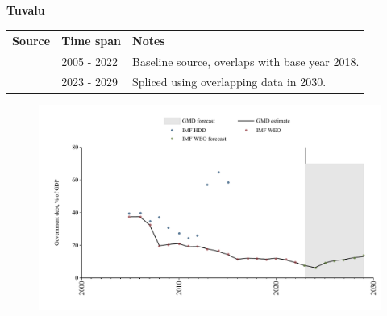 \documentclass[12pt,a4paper,landscape]{article}
\begin{document}
\begin{adjustbox}{max totalsize={\paperwidth}{\paperheight},center}
\begin{minipage}[t][\textheight][t]{\textwidth}
\vspace*{0.5cm}
{}
\begin{center}
{\Large\bfseries Tuvalu}
\end{center}
\vspace{0.5cm}
\begin{table}[H]
\centering
\small
\begin{tabular}{|l|l|l|}
\hline
\textbf{Source} & \textbf{Time span} & \textbf{Notes} \\
\hline
\rowcolor{white}\cite{IMF_WEO}& 2005 - 2022 &Baseline source, overlaps with base year 2018.\\
\rowcolor{lightgray}\cite{IMF_WEO_forecast}& 2023 - 2029 &Spliced using overlapping data in 2030.\\
\hline
\end{tabular}
\end{table}
\begin{figure}[H]
\centering
\includegraphics[width=\textwidth,height=0.6\textheight,keepaspectratio]{graphs/TUV_govdebt_GDP.pdf}
\end{figure}
\end{minipage}
\end{adjustbox}
\end{document}
